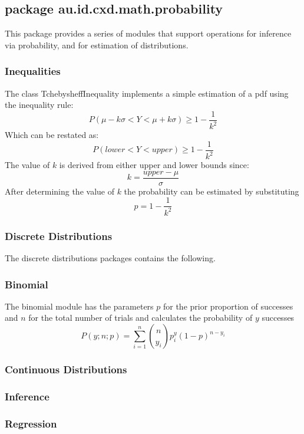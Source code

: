 \documentclass[a4paper]{article}
\begin{document}
\subsection{package au.id.cxd.math.probability}

This package provides a series of modules that support operations for inference via probability, and for estimation of distributions.

\subsubsection{Inequalities}

The class TchebysheffInequality implements a simple estimation of a pdf using the inequality rule:\\
$$
P(\mu - k\sigma < Y < \mu + k\sigma) \ge 1 - \frac{1}{k^2}
$$
Which can be restated as:
$$
P(lower < Y < upper) \ge 1 - \frac{1}{k^2}
$$
The value of $k$ is derived from either upper and lower bounds since:
$$
k = \frac{upper - \mu} {\sigma}
$$
After determining the value of $k$ the probability can be estimated by substituting
$$
p = 1 - \frac{1}{k^2}
$$

\subsubsection{Discrete Distributions}

The discrete distributions packages contains the following. 

\subsubsection{Binomial}

The binomial module has the parameters $p$ for the prior proportion of successes and $n$ for the total number of trials and calculates the probability of $y$ successes 
$$
P(y; n; p) = \sum_{i=1}^n {n \choose y_i} p^y_i (1-p)^{n-y_i} 
$$


\subsubsection{Continuous Distributions}

\subsubsection{Inference}

\subsubsection{Regression}
\end{document}
